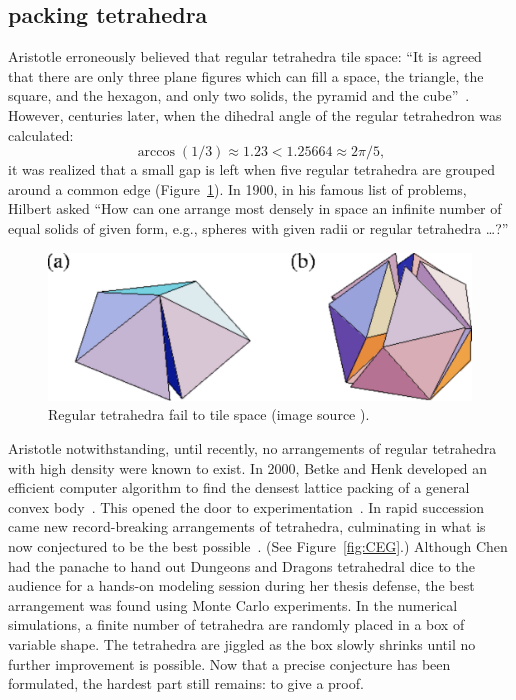 \documentclass{llncs}
\begin{document}
\subsection{packing  tetrahedra}

Aristotle erroneously believed that regular tetrahedra tile space:
``It is agreed that there are only three plane figures which can fill
a space, the triangle, the square, and the hexagon, and only two
solids, the pyramid and the cube''~\cite{Aristotle}.  However,
centuries later, when the dihedral angle of the regular tetrahedron
was calculated:
\[
\arccos(1/3) \approx 1.23 < 1.25664 \approx 2\pi/5,
\]
it was realized that a small gap is left when five regular tetrahedra
are grouped around a common edge (Figure~\ref{fig:gap}).  In 1900, in
his famous list of problems, Hilbert asked ``How can one arrange most
densely in space an infinite number of equal solids of given form,
e.g., spheres with given radii or regular tetrahedra \dots?''

\begin{figure}[h!]
  \centering
\includegraphics[scale=0.3]{tetrahedral_defect.pdf}
  \caption{Regular tetrahedra fail to tile space (image source \cite{tetrahedra}).}
\label{fig:gap}
\end{figure}

Aristotle notwithstanding, until recently, no arrangements of regular
tetrahedra with high density were known to exist.  In 2000, Betke and
Henk developed an efficient computer algorithm to find the densest
lattice packing of a general convex body~\cite{BH2000}.  This opened
the door to experimentation~\cite{Conway-2006}.  In rapid succession
came new record-breaking arrangements of tetrahedra, culminating in
what is now conjectured to be the best possible~\cite{Chen-2010}.
(See Figure~\ref{fig:CEG}.)  Although Chen had the panache to hand out
Dungeons and Dragons tetrahedral dice to the audience for a hands-on
modeling session during her thesis defense, the best arrangement was
found using Monte Carlo experiments.  In the numerical simulations, a
finite number of tetrahedra are randomly placed in a box of variable
shape.  The tetrahedra are jiggled as the box slowly shrinks until
no further improvement is possible.  Now that a precise conjecture has
been formulated, the hardest part still remains: to give a proof.
\end{document}
